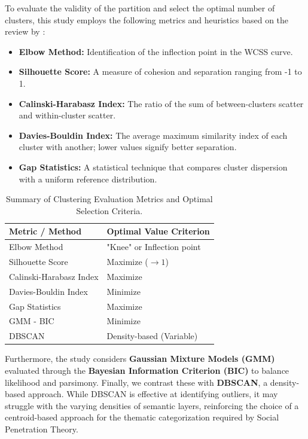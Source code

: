 To evaluate the validity of the partition and select the optimal number of clusters, this study employs the following metrics and heuristics based on the review by \cite{Naeem2023}:

\begin{itemize} 
    \item \textbf{Elbow Method:} Identification of the inflection point in the WCSS curve.
    \item \textbf{Silhouette Score:} A measure of cohesion and separation ranging from -1 to 1.
    \item \textbf{Calinski-Harabasz Index:} The ratio of the sum of between-clusters scatter and within-cluster scatter.
    \item \textbf{Davies-Bouldin Index:} The average maximum similarity index of each cluster with another; lower values signify better separation.
    \item \textbf{Gap Statistics:} A statistical technique that compares cluster dispersion with a uniform reference distribution.
\end{itemize}

\begin{table}[htbp]
\centering
\caption{Summary of Clustering Evaluation Metrics and Optimal Selection Criteria.}
\label{tab:clustering_metrics_simple}
\begin{tabular}{@{}ll@{}}
\toprule
\textbf{Metric / Method} & \textbf{Optimal Value Criterion} \\ \midrule
Elbow Method             & "Knee" or Inflection point       \\
Silhouette Score         & Maximize ($\to 1$)               \\
Calinski-Harabasz Index  & Maximize                         \\
Davies-Bouldin Index     & Minimize                         \\
Gap Statistics           & Maximize                         \\
GMM - BIC                & Minimize                         \\
DBSCAN                   & Density-based (Variable)         \\ \bottomrule
\end{tabular}
\end{table}

Furthermore, the study considers \textbf{Gaussian Mixture Models (GMM)} evaluated through the \textbf{Bayesian Information Criterion (BIC)} to balance likelihood and parsimony. Finally, we contrast these with \textbf{DBSCAN}, a density-based approach. While DBSCAN is effective at identifying outliers, it may struggle with the varying densities of semantic layers, reinforcing the choice of a centroid-based approach for the thematic categorization required by Social Penetration Theory.




